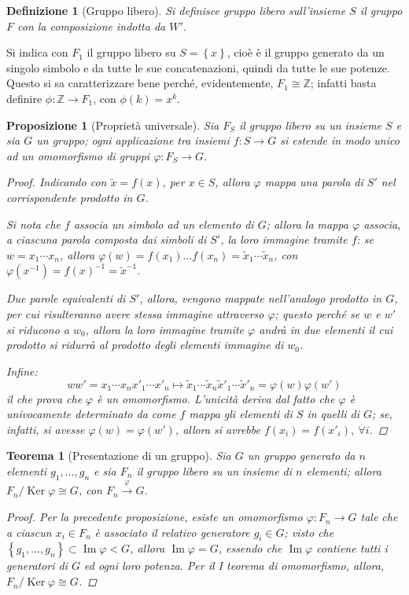 \documentclass[11pt]{scrartcl}
\theoremstyle{style1}
\newtheorem{teorema}{Teorema}[section]
\newtheorem{prop}{Proposizione}[section]
\newtheorem{definizione}{Definizione}[section]
\numberwithin{equation}{subsection}
\begin{document}
\begin{definizione}
	[Gruppo libero]
	Si definisce \textit{gruppo libero sull'insieme} $S$ il gruppo $F$ con la composizione indotta da $W'$.
\end{definizione}
\noindent Si indica con $F_1$ il gruppo libero su $S = \left\{ x \right\} $, cio\`e \`e il gruppo generato da un singolo simbolo e da tutte le sue concatenazioni, quindi da tutte le sue potenze.
Questo si sa caratterizzare bene perch\'e, evidentemente, $F_1 \cong \mathbb{Z}$; infatti basta definire $\phi :\mathbb{Z}\to F_1$, con $\phi (k) = x^k$.

\begin{prop}
	[Propriet\`a universale]
	Sia $F_S$ il gruppo libero su un insieme $S$ e sia $G$ un gruppo; ogni applicazione tra insiemi $f: S \to G$ si estende in modo unico ad un omomorfismo di gruppi $\varphi : F_S \to G$.
	\begin{proof} 
Indicando con $\widetilde{x}=f(x)$, per $x \in S$, allora $\varphi $ mappa una parola di $S'$ nel corrispondente prodotto in $G$.

Si nota che $f$ associa un simbolo ad un elemento di $G$; allora la mappa $\varphi $ associa, a ciascuna parola composta dai simboli di $S'$, la loro immagine tramite $f$: se $w = x_1 \cdots x_n$, allora $\varphi (w) = f(x_1) \ldots f(x_n)=\widetilde{x}_1 \cdots \widetilde{x}_n$, con $\varphi (x^{-1})=f(x)^{-1} = \widetilde{x}^{-1}$.

Due parole equivalenti di $S'$, allora, vengono mappate nell'analogo prodotto in $G$, per cui risulteranno avere stessa immagine attraverso $\varphi $; questo perch\'e se $w$ e $w'$ si riducono a $w_0$, allora la loro immagine tramite $\varphi $ andr\`a in due elementi il cui prodotto si ridurr\`a al prodotto degli elementi immagine di $w_0$.

Infine:
\[
w w'=x_1\cdots x_n x'_1\cdots x'_n\longmapsto \widetilde{x}_1 \cdots \widetilde{x}_n \widetilde{x}'_1 \cdots \widetilde{x}'_n= \varphi (w)\varphi (w')
\] 
il che prova che $\varphi $ \`e un omomorfismo.
L'unicit\`a deriva dal fatto che $\varphi $ \`e univocamente determinato da come $f$ mappa gli elementi di $S$ in quelli di $G$; se, infatti, si avesse $\varphi (w) = \varphi (w')$, allora si avrebbe $f(x_i) = f(x'_i), \ \forall i$.
	\end{proof}
\end{prop}
\begin{teorema}
	[Presentazione di un gruppo]
	Sia $G$ un gruppo generato da $n$ elementi $g_1,\ldots,g_n$ e sia $F_n$ il gruppo libero su un insieme di $n$ elementi; allora $F_n / \operatorname{Ker} \varphi  \cong G$, con $F_n \stackrel{\varphi }{\longrightarrow} G$.
	\begin{proof}
		Per la precedente proposizione, esiste un omomorfismo $\varphi : F_n \to G$ tale che a ciascun $x_i \in F_n$ \`e associato il relativo generatore $g_i \in G$; visto che $\left\{ g_1,\ldots,g_n \right\} \subset \operatorname{Im} \varphi < G$, allora $\operatorname{Im} \varphi = G$, essendo che $\operatorname{Im} \varphi $ contiene tutti i generatori di $G$ ed ogni loro potenza.
		Per il I teorema di omomorfismo, allora, $F_n / \operatorname{Ker} \varphi \cong G$.
	\end{proof}
\end{teorema}
\end{document}
